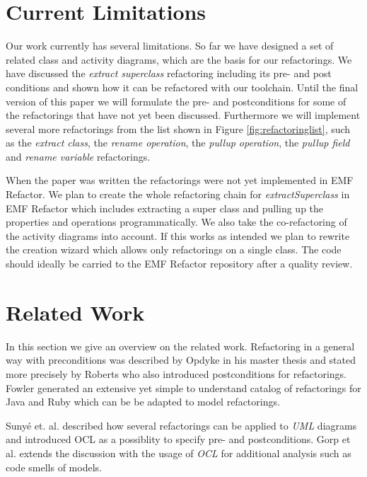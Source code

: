 \documentclass{llncs}
\begin{document}
\section{Current Limitations}
\label{sec:limitations}
Our work currently has several limitations. So far we have designed a set of related class and activity diagrams,
which are the basis for our refactorings. We have discussed the \textit{extract superclass} refactoring including its
pre- and post conditions and shown how it can be refactored with our toolchain. Until the final version of this
paper we will formulate the pre- and postconditions for some of the refactorings that have not yet been discussed.
Furthermore we will implement several more refactorings from the list shown in Figure \ref{fig:refactoringlist}, such as the
\textit{extract class}, the \textit{rename operation}, the \textit{pullup operation}, the \textit{pullup field} and 
\textit{rename variable} refactorings.

When the paper was written the refactorings were not yet implemented in EMF Refactor.
We plan to create the whole refactoring chain for \textit{extractSuperclass} in EMF Refactor which includes extracting 
a super class and pulling up the properties and operations programmatically. We also take the co-refactoring of the activity 
diagrams into account. If this works as intended we plan to rewrite the creation wizard which allows only refactorings 
on a single class. The code should ideally be carried to the EMF Refactor repository after a quality review.

\section{Related Work}
\label{sec:relatedwork}

In this section we give an overview on the related work. Refactoring in a general way with preconditions was described
by Opdyke \cite{mast:REFOOF} in his master thesis and stated more precisely by Roberts \cite{rob99} who also introduced
postconditions for refactorings. Fowler \cite{fow99} generated an extensive yet simple to understand catalog of
refactorings for Java and Ruby which can be be adapted to model refactorings.


Suny{\'e} et. al. \cite{DBLP:conf/uml/SunyePTJ01} described how several refactorings can be applied to \textit{UML}
diagrams and introduced OCL as a possiblity to specify pre- and postconditions. Gorp et al. \cite{gorp03} extends the
discussion with the usage of \textit{OCL} for additional analysis such as code smells of models.
\end{document}
